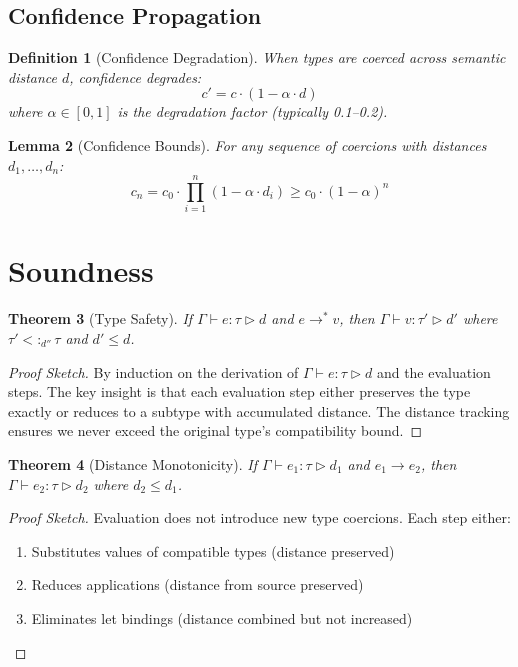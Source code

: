 \documentclass{article}
\newtheorem{theorem}{Theorem}[section]
\newtheorem{lemma}[theorem]{Lemma}
\newtheorem{definition}[theorem]{Definition}
\begin{document}
\subsection{Confidence Propagation}

\begin{definition}[Confidence Degradation]
When types are coerced across semantic distance $d$, confidence degrades:
\[
c' = c \cdot (1 - \alpha \cdot d)
\]
where $\alpha \in [0, 1]$ is the degradation factor (typically 0.1--0.2).
\end{definition}

\begin{lemma}[Confidence Bounds]
For any sequence of coercions with distances $d_1, \ldots, d_n$:
\[
c_n = c_0 \cdot \prod_{i=1}^{n} (1 - \alpha \cdot d_i) \geq c_0 \cdot (1 - \alpha)^n
\]
\end{lemma}

\section{Soundness}

\begin{theorem}[Type Safety]
If $\Gamma \vdash e : \tau \triangleright d$ and $e \to^* v$, then
$\Gamma \vdash v : \tau' \triangleright d'$ where $\tau' <:_{d''} \tau$
and $d' \leq d$.
\end{theorem}

\begin{proof}[Proof Sketch]
By induction on the derivation of $\Gamma \vdash e : \tau \triangleright d$
and the evaluation steps. The key insight is that each evaluation step
either preserves the type exactly or reduces to a subtype with accumulated
distance. The distance tracking ensures we never exceed the original
type's compatibility bound.
\end{proof}

\begin{theorem}[Distance Monotonicity]
If $\Gamma \vdash e_1 : \tau \triangleright d_1$ and $e_1 \to e_2$,
then $\Gamma \vdash e_2 : \tau \triangleright d_2$ where $d_2 \leq d_1$.
\end{theorem}

\begin{proof}[Proof Sketch]
Evaluation does not introduce new type coercions. Each step either:
\begin{enumerate}
\item Substitutes values of compatible types (distance preserved)
\item Reduces applications (distance from source preserved)
\item Eliminates let bindings (distance combined but not increased)
\end{enumerate}
\end{proof}
\end{document}
